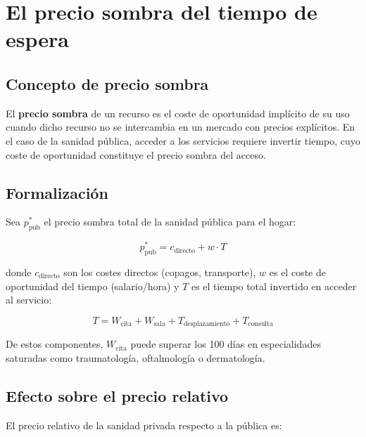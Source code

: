 \section{El precio sombra del tiempo de espera}

\subsection{Concepto de precio sombra}

El \textbf{precio sombra} de un recurso es el coste de oportunidad implícito de
su uso cuando dicho recurso no se intercambia en un mercado con precios explícitos.
En el caso de la sanidad pública, acceder a los servicios requiere invertir tiempo,
cuyo coste de oportunidad constituye el precio sombra del acceso.

\subsection{Formalización}

Sea $p_{\text{pub}}^{*}$ el precio sombra total de la sanidad pública para el
hogar:

\begin{equation}
  p_{\text{pub}}^{*} = c_{\text{directo}} + w \cdot T
  \label{eq:precio_sombra}
\end{equation}

donde $c_{\text{directo}}$ son los costes directos (copagos, transporte), $w$ es
el coste de oportunidad del tiempo (salario/hora) y $T$ es el tiempo total
invertido en acceder al servicio:

\begin{equation}
  T = W_{\text{cita}} + W_{\text{sala}} + T_{\text{desplazamiento}}
      + T_{\text{consulta}}
  \label{eq:tiempo_total}
\end{equation}

De estos componentes, $W_{\text{cita}}$ puede superar los 100 días en
especialidades saturadas como traumatología, oftalmología o dermatología.

\subsection{Efecto sobre el precio relativo}

El precio relativo de la sanidad privada respecto a la pública es:

